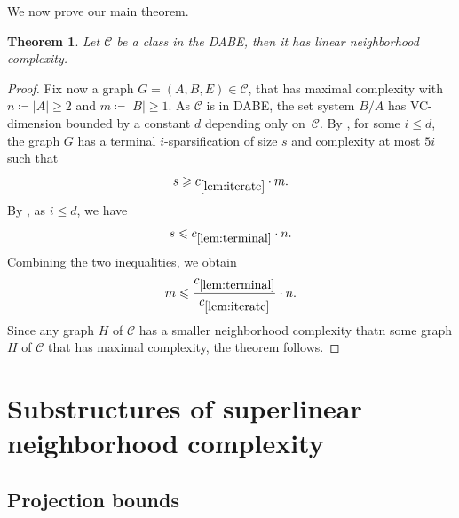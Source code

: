 \documentclass[11pt]{article}
\newtheorem{theorem}{Theorem}
\theoremstyle{definition}
\newcommand{\CC}{{\mathscr C}}
\newcommand{\inducedSS}[2]{#1/#2}%
\renewcommand{\le}{\leqslant}
\renewcommand{\ge}{\geqslant}
\begin{document}
We now prove our main theorem.

\begin{theorem}
Let $\CC$ be a class in the DABE, then it has linear neighborhood complexity.
\end{theorem}
\begin{proof}
Fix now a graph $G=(A,B,E)\in\CC$, that has maximal complexity with $n\coloneqq |A| \ge 2$ and $m\coloneqq |B| \ge 1$.
As $\CC$ is in DABE, the set system $\inducedSS{B}{A}$ has
VC-dimension bounded by a constant $d$ depending only on~$\CC$.
By , for some $i\le d$, the graph $G$ has a
terminal $i$-sparsification of size $s$ and complexity at most $5i$ such
that
\[
  s\ge c_{\ref{lem:iterate}} \cdot m.
\]
By , as $i\le d$, we have
\[
  s
  \le c_{\ref{lem:terminal}} \cdot n.
\]
Combining the two inequalities, we obtain
\[
  m
  \le \frac{c_{\ref{lem:terminal}}}{c_{\ref{lem:iterate}}} \cdot n.
\]
Since any graph $H$ of $\CC$ has a smaller neighborhood complexity thatn some graph $H$ of $\CC$ that has maximal complexity, the theorem follows.
\end{proof}

\section{Substructures of superlinear neighborhood complexity}

\subsection{Projection bounds}
\end{document}
